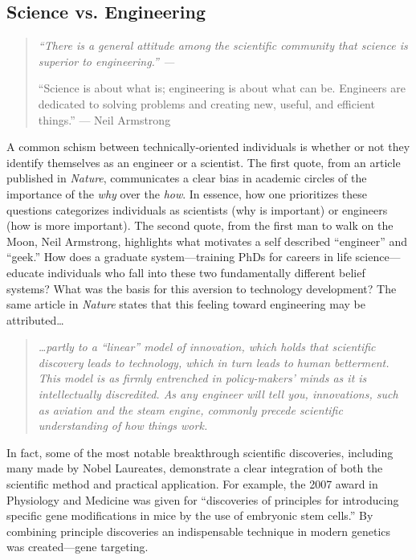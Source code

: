   \subsection{Science vs. Engineering}
    \label{Disc:subsec:Science and Engineering}

    \begin{quote}
      \itshape 
      \singlespacing
      ``There is a general attitude among the scientific community that science is superior to engineering.'' --- \citep{Macilwain2010}

      ``Science is about what is; engineering is about what can be. Engineers are dedicated to solving problems and creating new, useful, and efficient things.'' --- Neil Armstrong
      \end{quote}

    A common schism between technically-oriented individuals is whether or not they identify themselves as an engineer or a scientist. The first quote, from an article published in \textit{Nature}, communicates a clear bias in academic circles of the importance of the \textit{why} over the \textit{how}. In essence, how one prioritizes these questions categorizes individuals as scientists (why is important) or engineers (how is more important). The second quote, from the first man to walk on the Moon, Neil Armstrong, highlights what motivates a self described ``engineer'' and ``geek.'' How does a graduate system---training PhDs for careers in life science---educate individuals who fall into these two fundamentally different belief systems? What was the basis for this aversion to technology development? The same article in \textit{Nature} states that this feeling toward engineering may be attributed\ldots

    \begin{quote} 
      \itshape 
      \singlespacing
      \ldots partly to a ``linear'' model of innovation, which holds that scientific discovery leads to technology, which in turn leads to human betterment. This model is as firmly entrenched in policy-makers' minds as it is intellectually discredited. As any engineer will tell you, innovations, such as aviation and the steam engine, commonly precede scientific understanding of how things work.
      \end{quote} 

    In fact, some of the most notable breakthrough scientific discoveries, including many made by Nobel Laureates, demonstrate a clear integration of both the scientific method and practical application. For example, the 2007 award in Physiology and Medicine was given for ``discoveries of principles for introducing specific gene modifications in mice by the use of embryonic stem cells.'' By combining principle discoveries an indispensable technique in modern genetics was created---gene targeting.


